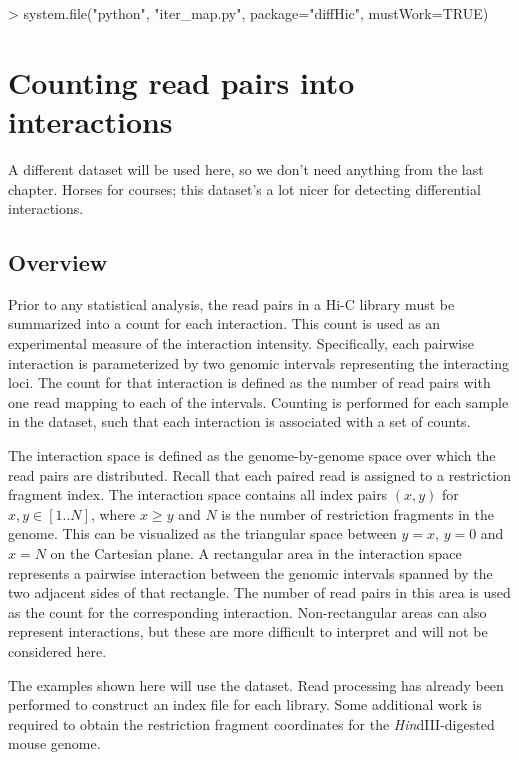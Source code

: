 \documentclass[12pt]{report}
\renewenvironment{Schunk}{\vspace{0pt}}{\vspace{0pt}}
\newenvironment{combox}
{ \begin{shaded}\begin{center}\begin{minipage}[t]{0.95\textwidth} }
{ \end{minipage}\end{center}\end{shaded} }
\begin{document}
\begin{Schunk}
\begin{Sinput}
> system.file("python", "iter_map.py", package="diffHic", mustWork=TRUE)
\end{Sinput}
\end{Schunk}


\chapter{Counting read pairs into interactions}
\label{chap:counting}

\begin{combox}
A different dataset will be used here, so we don't need anything from the last chapter.
Horses for courses; this dataset's a lot nicer for detecting differential interactions.
\end{combox}

\section{Overview}
Prior to any statistical analysis, the read pairs in a Hi-C library must be summarized into a count for each interaction.
This count is used as an experimental measure of the interaction intensity.
Specifically, each pairwise interaction is parameterized by two genomic intervals representing the interacting loci.
The count for that interaction is defined as the number of read pairs with one read mapping to each of the intervals.
Counting is performed for each sample in the dataset, such that each interaction is associated with a set of counts.

The interaction space is defined as the genome-by-genome space over which the read pairs are distributed.
Recall that each paired read is assigned to a restriction fragment index.
The interaction space contains all index pairs $(x, y)$ for $x, y \in [1 .. N]$, where $x \ge y$ and $N$ is the number of restriction fragments in the genome.
This can be visualized as the triangular space between $y=x$, $y=0$ and $x=N$ on the Cartesian plane.
A rectangular area in the interaction space represents a pairwise interaction between the genomic intervals spanned by the two adjacent sides of that rectangle.
The number of read pairs in this area is used as the count for the corresponding interaction.
Non-rectangular areas can also represent interactions, but these are more difficult to interpret and will not be considered here.

The examples shown here will use the \citeauthor{sofueva2013cohesin} dataset.
Read processing has already been performed to construct an index file for each library.
Some additional work is required to obtain the restriction fragment coordinates for the \textit{Hin}dIII-digested mouse genome.
\end{document}
